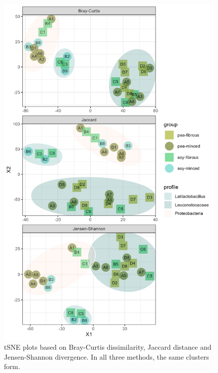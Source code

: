 \documentclass[preprint, 3p,
authoryear]{elsarticle} %
\begin{document}
\begin{figure}

{\centering \includegraphics[width=0.8\linewidth]{FigSM4} 

}

\caption{\label{figSM3} tSNE plots based on Bray-Curtis dissimilarity, Jaccard distance and Jensen-Shannon divergence. In all three methods, the same clusters form.  }\label{fig:figSM3}
\end{figure}
\end{document}
